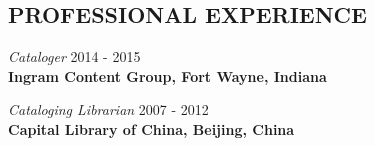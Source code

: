 \documentclass[margin, 10pt]{res} %
\begin{document}
\begin{resume}
\section{PROFESSIONAL EXPERIENCE}

\textit{Cataloger} \hfill 2014 - 2015\\
\textbf{Ingram Content Group, Fort Wayne, Indiana}

\textit{Cataloging Librarian} \hfill 2007 - 2012\\
\textbf{Capital Library of China, Beijing, China}



\end{resume}
\end{document}
